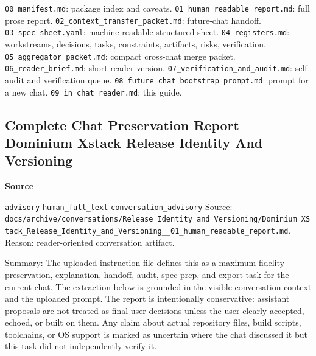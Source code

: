 \documentclass[9pt,a4paper,openany]{book}
\newcommand{\vonecallout}[3]{\par\medskip\noindent\begingroup\setlength{\fboxsep}{7pt}\colorbox{DomCalloutBg}{\parbox{0.94\linewidth}{\textbf{\textcolor{#1}{#2}}\par #3}}\endgroup\par\medskip}
\begin{document}
\texttt{00\_\allowbreak{}manifest.\allowbreak{}md}: package index and caveats.\allowbreak{} \texttt{01\_\allowbreak{}human\_\allowbreak{}readable\_\allowbreak{}report.\allowbreak{}md}: full prose report.\allowbreak{} \texttt{02\_\allowbreak{}context\_\allowbreak{}transfer\_\allowbreak{}packet.\allowbreak{}md}: future-\allowbreak{}chat handoff.\allowbreak{} \texttt{03\_\allowbreak{}spec\_\allowbreak{}sheet.\allowbreak{}yaml}: machine-\allowbreak{}readable structured sheet.\allowbreak{} \texttt{04\_\allowbreak{}registers.\allowbreak{}md}: workstreams, decisions, tasks, constraints, artifacts, risks, verification.\allowbreak{} \texttt{05\_\allowbreak{}aggregator\_\allowbreak{}packet.\allowbreak{}md}: compact cross-\allowbreak{}chat merge packet.\allowbreak{} \texttt{06\_\allowbreak{}reader\_\allowbreak{}brief.\allowbreak{}md}: short reader version.\allowbreak{} \texttt{07\_\allowbreak{}verification\_\allowbreak{}and\_\allowbreak{}audit.\allowbreak{}md}: self-\allowbreak{}audit and verification queue.\allowbreak{} \texttt{08\_\allowbreak{}future\_\allowbreak{}chat\_\allowbreak{}bootstrap\_\allowbreak{}prompt.\allowbreak{}md}: prompt for a new chat.\allowbreak{} \texttt{09\_\allowbreak{}in\_\allowbreak{}chat\_\allowbreak{}reader.\allowbreak{}md}: this guide.\allowbreak{}



\subsection{Complete Chat Preservation Report Dominium Xstack Release Identity And Versioning}

\vonecallout{DomSlate}{Source}{\texttt{advisory} \texttt{human\_\allowbreak{}full\_\allowbreak{}text} \texttt{conversation\_\allowbreak{}advisory} Source: \texttt{docs/\allowbreak{}archive/\allowbreak{}conversations/\allowbreak{}Release\_\allowbreak{}Identity\_\allowbreak{}and\_\allowbreak{}Versioning/\allowbreak{}Dominium\_\allowbreak{}XStack\_\allowbreak{}Release\_\allowbreak{}Identity\_\allowbreak{}and\_\allowbreak{}Versioning\_\allowbreak{}\_\allowbreak{}01\_\allowbreak{}human\_\allowbreak{}readable\_\allowbreak{}report.\allowbreak{}md}.\allowbreak{} Reason: reader-\allowbreak{}oriented conversation artifact.\allowbreak{}}

Summary: The uploaded instruction file defines this as a maximum-\allowbreak{}fidelity preservation, explanation, handoff, audit, spec-\allowbreak{}prep, and export task for the current chat.\allowbreak{} The extraction below is grounded in the visible conversation context and the uploaded prompt.\allowbreak{} The report is intentionally conservative: assistant proposals are not treated as final user decisions unless the user clearly accepted, echoed, or built on them.\allowbreak{} Any claim about actual repository files, build scripts, toolchains, or OS support is marked as uncertain where the chat discussed it but this task did not independently verify it.\allowbreak{}
\end{document}
